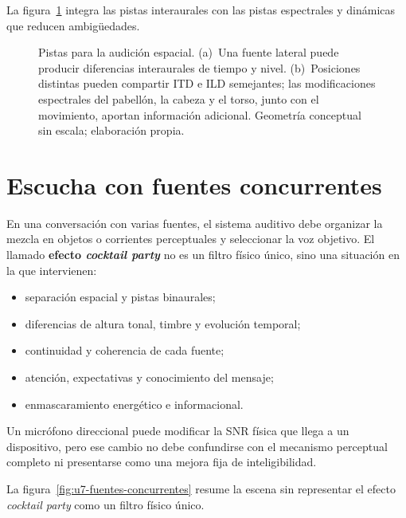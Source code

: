 La figura~\ref{fig:u7-localizacion} integra las pistas interaurales con las
pistas espectrales y dinámicas que reducen ambigüedades.

\begin{figure}[htbp]
    \centering
    
    \caption{Pistas para la audición espacial. (a)~Una fuente lateral puede
    producir diferencias interaurales de tiempo y nivel. (b)~Posiciones
    distintas pueden compartir ITD e ILD semejantes; las modificaciones
    espectrales del pabellón, la cabeza y el torso, junto con el movimiento,
    aportan información adicional. Geometría conceptual sin escala;
    elaboración propia.}
    \label{fig:u7-localizacion}
\end{figure}

\section{Escucha con fuentes concurrentes}
\label{sec:u7-cocktail-party}

En una conversación con varias fuentes, el sistema auditivo debe organizar la
mezcla en objetos o corrientes perceptuales y seleccionar la voz objetivo. El
llamado \textbf{efecto \emph{cocktail party}} no es un filtro físico único,
sino una situación en la que intervienen:

\begin{itemize}
    \item separación espacial y pistas binaurales;
    \item diferencias de altura tonal, timbre y evolución temporal;
    \item continuidad y coherencia de cada fuente;
    \item atención, expectativas y conocimiento del mensaje;
    \item enmascaramiento energético e informacional.
\end{itemize}

 Un micrófono
direccional puede modificar la SNR física que llega a un dispositivo, pero ese
cambio no debe confundirse con el mecanismo perceptual completo ni presentarse
como una mejora fija de inteligibilidad.

La figura~\ref{fig:u7-fuentes-concurrentes} resume la escena sin representar el
efecto \emph{cocktail party} como un filtro físico único.

